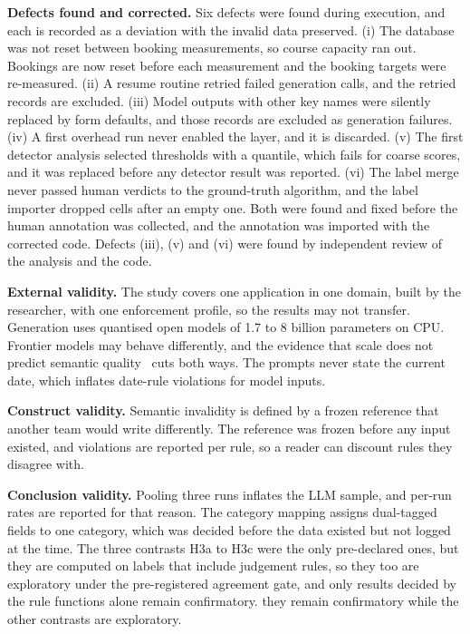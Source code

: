 \documentclass[conference]{IEEEtran}
\begin{document}
\textbf{Defects found and corrected.} Six defects were found during execution, and each is recorded as
a deviation with the invalid data preserved. (i) The database was not reset between booking
measurements, so course capacity ran out. Bookings are now reset before each measurement and the
booking targets were re-measured. (ii) A resume routine retried failed generation calls, and the
retried records are excluded. (iii) Model outputs with other key names were silently replaced by form
defaults, and those records are excluded as generation failures. (iv) A first overhead run never
enabled the layer, and it is discarded. (v) The first detector analysis selected thresholds with a
quantile, which fails for coarse scores, and it was replaced before any detector result was reported.
(vi) The label merge never passed human verdicts to the ground-truth algorithm, and the label importer
dropped cells after an empty one. Both were found and fixed before the human annotation was collected,
and the annotation was imported with the corrected code. Defects (iii), (v) and (vi) were found by
independent review of the analysis and the code.

\textbf{External validity.} The study covers one application in one domain, built by the researcher,
with one enforcement profile, so the results may not transfer. Generation uses quantised open models of
1.7 to 8 billion parameters on CPU. Frontier models may behave differently, and the evidence that scale
does not predict semantic quality~\cite{singh2026sob,wrenn2026enterprise} cuts both ways. The prompts
never state the current date, which inflates date-rule violations for model inputs.

\textbf{Construct validity.} Semantic invalidity is defined by a frozen reference that another team
would write differently. The reference was frozen before any input existed, and violations are reported
per rule, so a reader can discount rules they disagree with.

\textbf{Conclusion validity.} Pooling three runs inflates the LLM sample, and per-run rates are
reported for that reason. The category mapping assigns dual-tagged fields to one category, which was
decided before the data existed but not logged at the time. The three contrasts H3a to H3c were the
only pre-declared ones, but they are computed on labels that include judgement rules,
so\ifjudgeweak{} they too are exploratory under the pre-registered agreement gate, and only results
decided by the rule functions alone remain confirmatory.\else{} they remain confirmatory while the
other contrasts are exploratory.\fi
\end{document}

